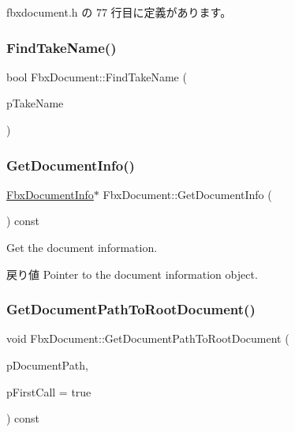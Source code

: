  fbxdocument.\+h の 77 行目に定義があります。

\mbox{\label{class_fbx_document_aefcce26df173f0391b6540c003c52ea9}} 
\subsubsection{\texorpdfstring{Find\+Take\+Name()}{FindTakeName()}}
{\footnotesize\ttfamily bool Fbx\+Document\+::\+Find\+Take\+Name (\begin{DoxyParamCaption}\item[{const \hyperlink{class_fbx_string}{Fbx\+String} \&}]{p\+Take\+Name }\end{DoxyParamCaption})\hspace{0.3cm}{\ttfamily [protected]}}

\mbox{\label{class_fbx_document_a396a7cf0d0c422a872a6df2cec608b11}} 
\subsubsection{\texorpdfstring{Get\+Document\+Info()}{GetDocumentInfo()}}
{\footnotesize\ttfamily \hyperlink{class_fbx_document_info}{Fbx\+Document\+Info}$\ast$ Fbx\+Document\+::\+Get\+Document\+Info (\begin{DoxyParamCaption}{ }\end{DoxyParamCaption}) const}

Get the document information. \begin{DoxyReturn}{戻り値}
Pointer to the document information object. 
\end{DoxyReturn}
\mbox{\label{class_fbx_document_acdf3bb31bc3a0e3d2c9a8b73fb2fff30}} 
\subsubsection{\texorpdfstring{Get\+Document\+Path\+To\+Root\+Document()}{GetDocumentPathToRootDocument()}}
{\footnotesize\ttfamily void Fbx\+Document\+::\+Get\+Document\+Path\+To\+Root\+Document (\begin{DoxyParamCaption}\item[{\hyperlink{class_fbx_array}{Fbx\+Array}$<$ \hyperlink{class_fbx_document}{Fbx\+Document} $\ast$$>$ \&}]{p\+Document\+Path,  }\item[{bool}]{p\+First\+Call = {\ttfamily true} }\end{DoxyParamCaption}) const}

